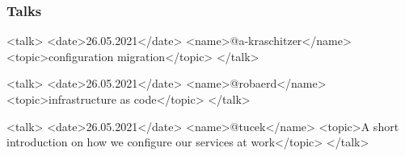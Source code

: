 \begin{frame}[fragile]
	\frametitle{Talks}

	\small
	\begin{code}[language=xml]
  <talk>
    <date>26.05.2021</date>
    <name>@a-kraschitzer</name>
    <topic>configuration migration</topic>
  </talk>

  <talk>
    <date>26.05.2021</date>
    <name>@robaerd</name>
    <topic>infrastructure as code</topic>
  </talk>

  <talk>
    <date>26.05.2021</date>
    <name>@tucek</name>
    <topic>A short introduction on how we configure our services at work</topic>
  </talk>
	\end{code}
\end{frame}




\appendix

\begin{frame}[allowframebreaks]
	
	
\end{frame}




